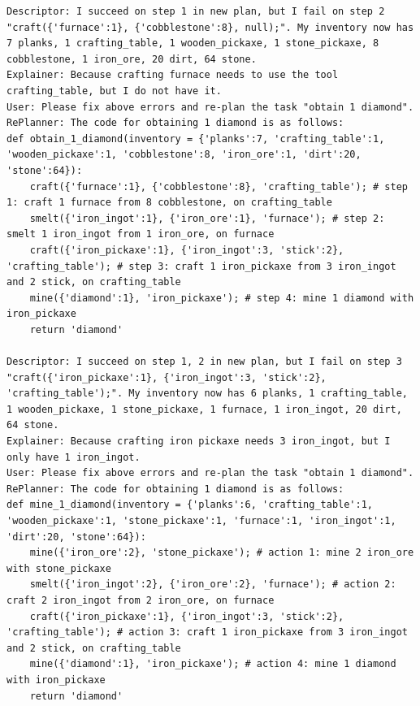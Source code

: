 \begin{lstlisting}
Descriptor: I succeed on step 1 in new plan, but I fail on step 2 "craft({'furnace':1}, {'cobblestone':8}, null);". My inventory now has 7 planks, 1 crafting_table, 1 wooden_pickaxe, 1 stone_pickaxe, 8 cobblestone, 1 iron_ore, 20 dirt, 64 stone.
Explainer: Because crafting furnace needs to use the tool crafting_table, but I do not have it.
User: Please fix above errors and re-plan the task "obtain 1 diamond".
RePlanner: The code for obtaining 1 diamond is as follows:
def obtain_1_diamond(inventory = {'planks':7, 'crafting_table':1, 'wooden_pickaxe':1, 'cobblestone':8, 'iron_ore':1, 'dirt':20, 'stone':64}):
    craft({'furnace':1}, {'cobblestone':8}, 'crafting_table'); # step 1: craft 1 furnace from 8 cobblestone, on crafting_table
    smelt({'iron_ingot':1}, {'iron_ore':1}, 'furnace'); # step 2: smelt 1 iron_ingot from 1 iron_ore, on furnace
    craft({'iron_pickaxe':1}, {'iron_ingot':3, 'stick':2}, 'crafting_table'); # step 3: craft 1 iron_pickaxe from 3 iron_ingot and 2 stick, on crafting_table
    mine({'diamond':1}, 'iron_pickaxe'); # step 4: mine 1 diamond with iron_pickaxe
    return 'diamond'

Descriptor: I succeed on step 1, 2 in new plan, but I fail on step 3 "craft({'iron_pickaxe':1}, {'iron_ingot':3, 'stick':2}, 'crafting_table');". My inventory now has 6 planks, 1 crafting_table, 1 wooden_pickaxe, 1 stone_pickaxe, 1 furnace, 1 iron_ingot, 20 dirt, 64 stone.
Explainer: Because crafting iron pickaxe needs 3 iron_ingot, but I only have 1 iron_ingot.
User: Please fix above errors and re-plan the task "obtain 1 diamond".
RePlanner: The code for obtaining 1 diamond is as follows:
def mine_1_diamond(inventory = {'planks':6, 'crafting_table':1, 'wooden_pickaxe':1, 'stone_pickaxe':1, 'furnace':1, 'iron_ingot':1, 'dirt':20, 'stone':64}):
    mine({'iron_ore':2}, 'stone_pickaxe'); # action 1: mine 2 iron_ore with stone_pickaxe
    smelt({'iron_ingot':2}, {'iron_ore':2}, 'furnace'); # action 2: craft 2 iron_ingot from 2 iron_ore, on furnace
    craft({'iron_pickaxe':1}, {'iron_ingot':3, 'stick':2}, 'crafting_table'); # action 3: craft 1 iron_pickaxe from 3 iron_ingot and 2 stick, on crafting_table
    mine({'diamond':1}, 'iron_pickaxe'); # action 4: mine 1 diamond with iron_pickaxe
    return 'diamond'


\end{lstlisting}
